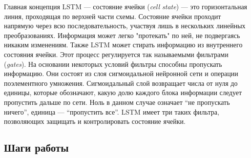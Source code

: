 \documentclass[14pt]{extarticle}
\begin{document}
Главная концепция LSTM --- состояние ячейки ({\it cell state}) --- это горизонтальная линия, проходящая по верхней части схемы. Состояние ячейки проходит напрямую через всю последовательность, участвуя лишь в нескольких линейных преобразованиях. Информация может легко "протекать" по ней, не подвергаясь никаким изменениям. Также LSTM может стирать информацию из внутреннего состояния ячейки. Этот процесс регулируется так называемыми фильтрами ({\it gates}). На основании некоторых условий фильтры способны пропускать информацию. Они состоят из слоя сигмоидальной нейронной сети и операции поэлементного умножения. Сигмоидальный слой возвращает числа от нуля до единицы, которые обозначают, какую долю каждого блока информации следует пропустить дальше по сети. Ноль в данном случае означает “не пропускать ничего”, единица --- “пропустить все”. LSTM имеет три таких фильтра, позволяющих защищать и контролировать состояние ячейки.


\subsection{Шаги работы}
\end{document}
